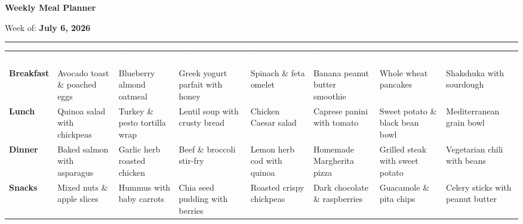 \documentclass[10pt]{article}
\begin{document}
\color{dark}

\begin{minipage}[b]{0.6\linewidth}
    {\Huge\bfseries\color{accent} Weekly Meal Planner}
\end{minipage}%
\begin{minipage}[b]{0.4\linewidth}
    \raggedleft
    {\Large\color{graytext} Week of: \textbf{July 6, 2026}}
\end{minipage}

\vspace{3mm}
{\color{accent}\hrule height 1.5pt}
\vspace{4mm}

\renewcommand{\arraystretch}{2.1} %
\small
\begin{tabularx}{\linewidth}{@{}>{\color{accent}\bfseries}l *{7}{>{\raggedright\arraybackslash}X}@{}}
    \rowcolor{accent}
    \textcolor{white}{\textbf{Meal}} & 
    \textcolor{white}{\textbf{Monday}} & 
    \textcolor{white}{\textbf{Tuesday}} & 
    \textcolor{white}{\textbf{Wednesday}} & 
    \textcolor{white}{\textbf{Thursday}} & 
    \textcolor{white}{\textbf{Friday}} & 
    \textcolor{white}{\textbf{Saturday}} & 
    \textcolor{white}{\textbf{Sunday}} \\
    
    \rowcolor{accentlight}
    Breakfast & 
    Avocado toast \& poached eggs & 
    Blueberry almond oatmeal & 
    Greek yogurt parfait with honey & 
    Spinach \& feta omelet & 
    Banana peanut butter smoothie & 
    Whole wheat pancakes & 
    Shakshuka with sourdough \\
    
    \rowcolor{white}
    Lunch & 
    Quinoa salad with chickpeas & 
    Turkey \& pesto tortilla wrap & 
    Lentil soup with crusty bread & 
    Chicken Caesar salad & 
    Caprese panini with tomato & 
    Sweet potato \& black bean bowl & 
    Mediterranean grain bowl \\
    
    \rowcolor{accentlight}
    Dinner & 
    Baked salmon with asparagus & 
    Garlic herb roasted chicken & 
    Beef \& broccoli stir-fry & 
    Lemon herb cod with quinoa & 
    Homemade Margherita pizza & 
    Grilled steak with sweet potato & 
    Vegetarian chili with beans \\
    
    \rowcolor{white}
    Snacks & 
    Mixed nuts \& apple slices & 
    Hummus with baby carrots & 
    Chia seed pudding with berries & 
    Roasted crispy chickpeas & 
    Dark chocolate \& raspberries & 
    Guacamole \& pita chips & 
    Celery sticks with peanut butter \\
\end{tabularx}
\end{document}
